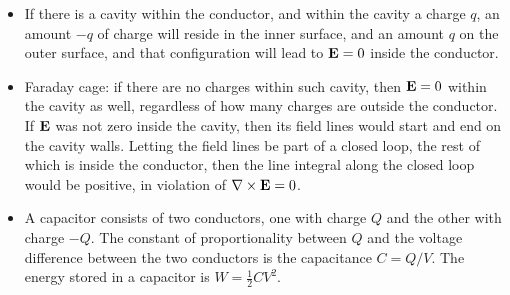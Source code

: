 \documentclass[11pt]{article}
\begin{document}
\begin{itemize}
\item If there is a cavity within the conductor, and within the cavity a charge $q$, an amount $-q$ of charge will reside in the inner surface, and an amount $q$ on the outer surface, and that configuration will lead to $\mathbf{E} = 0$ inside the conductor.

\item Faraday cage: if there are no charges within such cavity, then $\mathbf{E} = 0$ within the cavity as well, regardless of how many charges are outside the conductor. If $\mathbf{E}$ was not zero inside the cavity, then its field lines would start and end on the cavity walls. Letting the field lines be part of a closed loop, the rest of which is inside the conductor, then the line integral along the closed loop would be positive, in violation of $\nabla \times \mathbf{E} = 0$.

\item A capacitor consists of two conductors, one with charge $Q$ and the other with charge $-Q$. The constant of proportionality between $Q$ and the voltage difference between the two conductors is the capacitance $C = Q/V$. The energy stored in a capacitor is $W = \frac{1}{2} CV^2$.

\end{itemize}

\end{document}
